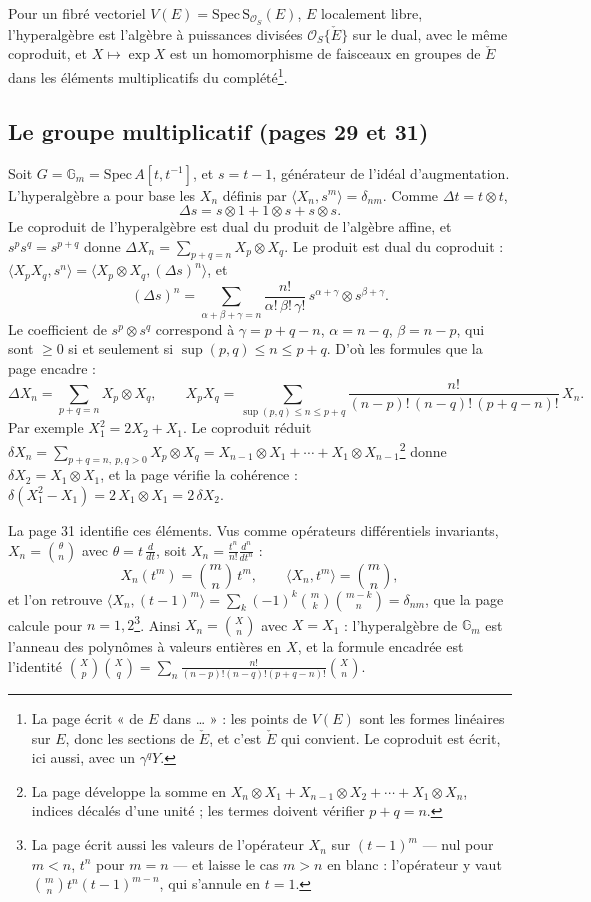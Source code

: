 \documentclass[11pt,a4paper]{article}
\begin{document}
Pour un fibré vectoriel $V(E) = \mathrm{Spec}\,\mathrm{S}_{\mathcal{O}_S}(E)$, $E$
localement libre, l'hyperalgèbre est l'algèbre à puissances divisées
$\mathcal{O}_S\{\check E\}$ sur le dual, avec le même coproduit, et
$X \mapsto \exp X$ est un homomorphisme de faisceaux en groupes de $\check E$ dans
les éléments multiplicatifs du complété\footnote{La page écrit « de $E$ dans … » :
les points de $V(E)$ sont les formes linéaires sur $E$, donc les sections de
$\check E$, et c'est $\check E$ qui convient. Le coproduit est écrit, ici aussi,
avec un $\gamma^q Y$.}.

\subsection*{Le groupe multiplicatif (pages 29 et 31)}

Soit $G = \mathbb{G}_m = \mathrm{Spec}\,A[t,t^{-1}]$, et $s = t - 1$, générateur
de l'idéal d'augmentation. L'hyperalgèbre a pour base les $X_n$ définis par
$\langle X_n, s^m \rangle = \delta_{nm}$. Comme $\Delta t = t \otimes t$,
\[
\Delta s = s \otimes 1 + 1 \otimes s + s \otimes s .
\]
Le coproduit de l'hyperalgèbre est dual du produit de l'algèbre affine, et
$s^p s^q = s^{p+q}$ donne $\Delta X_n = \sum_{p+q=n} X_p \otimes X_q$. Le produit
est dual du coproduit : $\langle X_p X_q, s^n \rangle = \langle X_p \otimes X_q,
(\Delta s)^n \rangle$, et
\[
(\Delta s)^n = \sum_{\alpha+\beta+\gamma = n}
\frac{n!}{\alpha!\,\beta!\,\gamma!}\, s^{\alpha+\gamma} \otimes s^{\beta+\gamma}.
\]
Le coefficient de $s^p \otimes s^q$ correspond à $\gamma = p+q-n$, $\alpha = n-q$,
$\beta = n-p$, qui sont $\geq 0$ si et seulement si $\sup(p,q) \leq n \leq p+q$.
D'où les formules que la page encadre :
\[
\Delta X_n = \sum_{p+q=n} X_p \otimes X_q, \qquad
X_p X_q = \sum_{\sup(p,q) \leq n \leq p+q}
\frac{n!}{(n-p)!\,(n-q)!\,(p+q-n)!}\, X_n .
\]
Par exemple $X_1^2 = 2X_2 + X_1$. Le coproduit réduit
$\delta X_n = \sum_{p+q=n,\ p,q>0} X_p \otimes X_q = X_{n-1} \otimes X_1 + \cdots
+ X_1 \otimes X_{n-1}$\footnote{La page développe la somme en
$X_n \otimes X_1 + X_{n-1} \otimes X_2 + \cdots + X_1 \otimes X_n$, indices décalés
d'une unité ; les termes doivent vérifier $p + q = n$.} donne
$\delta X_2 = X_1 \otimes X_1$, et la page vérifie la cohérence :
$\delta(X_1^2 - X_1) = 2\,X_1 \otimes X_1 = 2\,\delta X_2$.

La page 31 identifie ces éléments. Vus comme opérateurs différentiels invariants,
$X_n = \binom{\theta}{n}$ avec $\theta = t\,\frac{d}{dt}$, soit
$X_n = \frac{t^n}{n!}\frac{d^n}{dt^n}$ :
\[
X_n(t^m) = \binom{m}{n}\, t^m, \qquad \langle X_n, t^m \rangle = \binom{m}{n},
\]
et l'on retrouve $\langle X_n, (t-1)^m \rangle = \sum_k (-1)^k \binom{m}{k}
\binom{m-k}{n} = \delta_{nm}$, que la page calcule pour $n = 1, 2$\footnote{La
page écrit aussi les valeurs de l'opérateur $X_n$ sur $(t-1)^m$ — nul pour
$m < n$, $t^n$ pour $m = n$ — et laisse le cas $m > n$ en blanc : l'opérateur y vaut
$\binom{m}{n} t^n (t-1)^{m-n}$, qui s'annule en $t = 1$.}. Ainsi
$X_n = \binom{X}{n}$ avec $X = X_1$ : l'hyperalgèbre de $\mathbb{G}_m$ est l'anneau
des polynômes à valeurs entières en $X$, et la formule encadrée est l'identité
$\binom{X}{p}\binom{X}{q} = \sum_n \frac{n!}{(n-p)!(n-q)!(p+q-n)!}\binom{X}{n}$.
\end{document}
